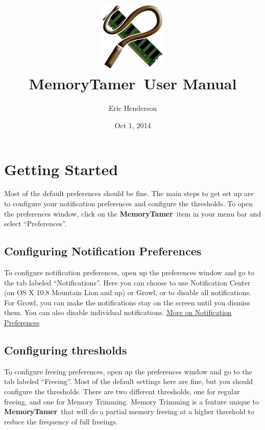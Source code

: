 \documentclass[]{article}
\newcommand{\MT}{\textbf{MemoryTamer}}
\begin{document}
\title{
\includegraphics[width=128px]{../resources/Icon}\\
\MT\ User Manual
}
\author{Eric Henderson}
\date{Oct 1, 2014}
\maketitle

\clearpage
\tableofcontents
\clearpage
\section{Getting Started}

Most of the default preferences should be fine.  The main steps to get set up are to configure your notification preferences and configure the thresholds.  To open the preferences window, click on the \MT\ item in your menu bar and select ``Preferences''.

\subsection{Configuring Notification Preferences}
To configure notification preferences, open up the preferences window and go to the tab labeled ``Notifications''.  Here you can choose to use Notification Center (on OS X 10.8 Mountain Lion and up) or Growl, or to disable all notifications.  For Growl, you can make the notifications stay on the screen until you dismiss them.  You can also disable individual notifications.  \hyperref[notifications]{More on Notification Preferences}

\subsection{Configuring thresholds}
To configure freeing preferences, open up the preferences window and go to the tab labeled ``Freeing''.  Most of the default settings here are fine, but you should configure the thresholds. There are two different thresholds, one for regular freeing, and one for Memory Trimming.  Memory Trimming is a feature unique to \MT\ that will do a partial memory freeing at a higher threshold to reduce the frequency of full freeings.
\end{document}

